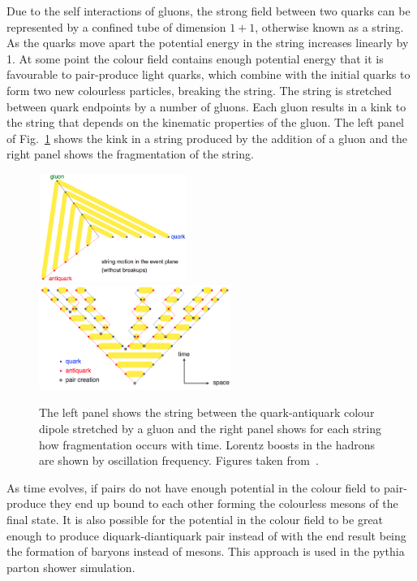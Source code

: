 Due to the self interactions of gluons, the strong field between two quarks can be represented by a confined tube of dimension $1+1$, otherwise known as a string. 
As the quarks move apart the potential energy in the string increases linearly by 1\GeV{}\fminv{}.
At some point the colour field contains enough potential energy that it is favourable to pair-produce light quarks, which combine with the initial quarks to form two new colourless particles, breaking the string.
The string is stretched between quark endpoints by a number of gluons.
Each gluon results in a kink to the string that depends on the kinematic properties of the gluon.
The left panel of Fig.~\ref{fig:Lund} shows the kink in a string produced by the addition of a gluon and the right panel shows the fragmentation of the string.
\begin{figure}[htpb]
	\centering
	\includegraphics[width=0.43\textwidth]{Figures/Generator_Lund2}
	\includegraphics[width=0.56\textwidth]{Figures/Generator_Lund}
	\caption[The left panel shows the string between the quark-antiquark colour dipole stretched by a gluon and the right panel shows for each string how fragmentation occurs with time. Lorentz boosts in the hadrons are shown by oscillation frequency. ]{The left panel shows the string between the quark-antiquark colour dipole stretched by a gluon and the right panel shows for each string how fragmentation occurs with time. Lorentz boosts in the hadrons are shown by oscillation frequency. Figures taken from~\cite{Gen:Lund}.}
	\label{fig:Lund}
\end{figure}
As time evolves, if \qqbar{} pairs do not have enough potential in the colour field to pair-produce they end up bound to each other forming the colourless mesons of the final state.
It is also possible for the potential in the colour field to be great enough to produce diquark-diantiquark pair instead of \qqbar{} with the end result being the formation of baryons instead of mesons.
This approach is used in the \acrshort{pythia} parton shower simulation.

